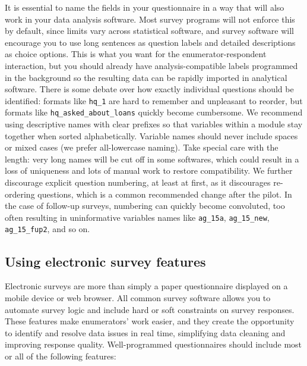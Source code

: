 It is essential to name the fields in your questionnaire
in a way that will also work in your data analysis software.
Most survey programs will not enforce this by default,
since limits vary across statistical software,
and survey software will encourage you
to use long sentences as question labels
and detailed descriptions as choice options.
This is what you want for the enumerator-respondent interaction,
but you should already have analysis-compatible labels programmed in the background
so the resulting data can be rapidly imported in analytical software.
There is some debate over how exactly individual questions should be identified:
formats like \texttt{hq\_1} are hard to remember and unpleasant to reorder,
but formats like \texttt{hq\_asked\_about\_loans} quickly become cumbersome.
We recommend using descriptive names with clear prefixes so that variables
within a module stay together when sorted alphabetically.
Variable names should never include spaces or mixed cases
(we prefer all-lowercase naming).
Take special care with the length: very long names will be cut off in some softwares,
which could result in a loss of uniqueness and lots of manual work to restore compatibility.
We further discourage explicit question numbering,
at least at first, as it discourages re-ordering questions,
which is a common recommended change after the pilot.
In the case of follow-up surveys, numbering can quickly become convoluted,
too often resulting in uninformative variables names like
\texttt{ag\_15a}, \texttt{ag\_15\_new}, \texttt{ag\_15\_fup2}, and so on.

\subsection{Using electronic survey features}

Electronic surveys are more than simply
a paper questionnaire displayed on a mobile device or web browser.
All common survey software allows you to automate survey logic
and include hard or soft constraints on survey responses.
These features make enumerators' work easier,
and they create the opportunity to identify and resolve
data issues in real time,
simplifying data cleaning and improving response quality.
Well-programmed questionnaires should include
most or all of the following features:

